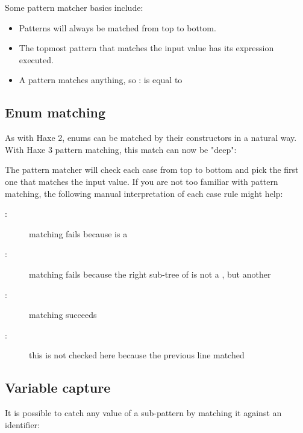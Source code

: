 \documentclass{haxe}
\begin{document}

Some pattern matcher basics include:

\begin{itemize}
	\item Patterns will always be matched from top to bottom.
	\item The topmost pattern that matches the input value has its expression executed.
	\item A \expr{_} pattern matches anything, so : is equal to 
\end{itemize}

\subsection{Enum matching}
\label{lf-pattern-matching-enums}

As with Haxe 2, enums can be matched by their constructors in a natural way. With Haxe 3 pattern matching, this match can now be "deep":


The pattern matcher will check each case from top to bottom and pick the first one that matches the input value. If you are not too familiar with pattern matching, the following manual interpretation of each case rule might help:

\begin{description}
	\item[:] matching fails because  is a 
	\item[:] matching fails because the right sub-tree of  is not a , but another 
	\item[:] matching succeeds
	\item[:] this is not checked here because the previous line matched
\end{description}

\subsection{Variable capture}
\label{lf-pattern-matching-variable-capture}

It is possible to catch any value of a sub-pattern by matching it against an identifier:

\end{document}
